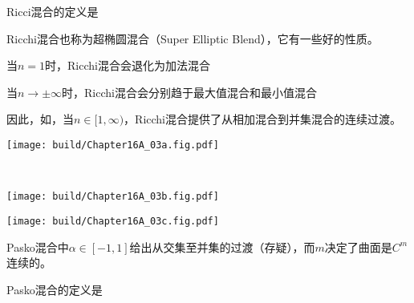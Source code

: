 \begin{BoxFormula}[Ricci混合]
    Ricci混合的定义是
\end{BoxFormula}
Ricchi混合也称为超椭圆混合（Super Elliptic Blend），它有一些好的性质。

当$n=1$时，Ricchi混合会退化为加法混合
当$n\to\pm\infty$时，Ricchi混合会分别趋于最大值混合和最小值混合

因此，如，当$n\in[1,\infty)$，Ricchi混合提供了从相加混合到并集混合的连续过渡。
\begin{Figure}[Ricci混合]
    \begin{FigureSub}[$n=1$;Ricci n=1]
        \texttt{[image: build/Chapter16A\_03a.fig.pdf]}
    \end{FigureSub}\\ \vspace{0.25cm}
    \begin{FigureSub}[$n=2$;Ricci n=2]
        \texttt{[image: build/Chapter16A\_03b.fig.pdf]}
    \end{FigureSub}
    \begin{FigureSub}[$n=4$;Ricci n=4]
        \texttt{[image: build/Chapter16A\_03c.fig.pdf]}
    \end{FigureSub}
\end{Figure}

Pasko混合中$\alpha\in[-1,1]$给出从交集至并集的过渡（存疑），而$m$决定了曲面是$C^m$连续的。
\begin{BoxFormula}[Pasko混合]
    Pasko混合的定义是
\end{BoxFormula}

